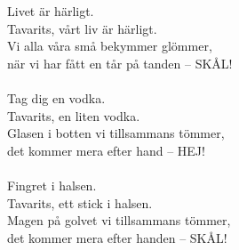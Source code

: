 
            Livet är härligt. \\
            Tavarits, vårt liv är härligt. \\
            Vi alla våra små bekymmer glömmer, \\
            när vi har fått en tår på tanden – SKÅL! \\
\hspace{10mm} \\
            Tag dig en vodka. \\
            Tavarits, en liten vodka. \\
            Glasen i botten vi tillsammans tömmer, \\
            det kommer mera efter hand – HEJ! \\
\hspace{10mm} \\
            Fingret i halsen. \\
            Tavarits, ett stick i halsen. \\
            Magen på golvet vi tillsammans tömmer, \\
            det kommer mera efter handen – SKÅL! \\

